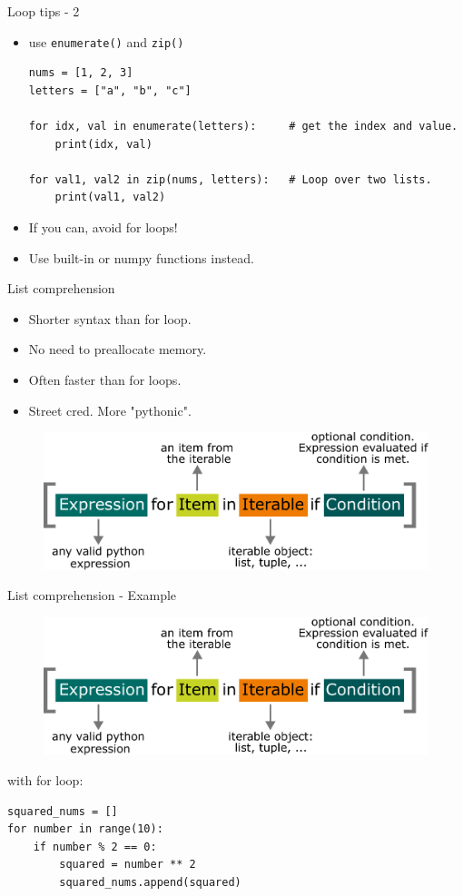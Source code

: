 \documentclass[compress%
,aspectratio=169%
]{beamer}
\newcommand{\code}{\lstinline}
\begin{document}
\begin{frame}[fragile]{Loop tips - 2}
\begin{itemize}
    \item use \code|enumerate()| and \code|zip()|
    
\begin{lstlisting}
nums = [1, 2, 3]
letters = ["a", "b", "c"]

for idx, val in enumerate(letters):     # get the index and value.
    print(idx, val)

for val1, val2 in zip(nums, letters):   # Loop over two lists.
    print(val1, val2)
\end{lstlisting}

    \item If you can, \alert{avoid for loops!}
    \item Use built-in or numpy functions instead.
\end{itemize}

\end{frame}




\begin{frame}[fragile]{List comprehension}
    \begin{itemize}
        \item Shorter syntax than for loop.
        \item No need to preallocate memory.
        \item Often faster than for loops.
        \item Street cred. More "pythonic".
    \end{itemize}
    
\begin{figure}
    \centering
    \includegraphics[width=0.6\linewidth]{img/list_comprehension.pdf}
\end{figure}
\end{frame}

\begin{frame}[fragile]{List comprehension - Example}
\begin{figure}
    \centering
    \includegraphics[width=0.6\linewidth]{img/list_comprehension.pdf}
\end{figure}

with for loop:
\begin{lstlisting}
squared_nums = []
for number in range(10):
    if number % 2 == 0:
        squared = number ** 2
        squared_nums.append(squared)
\end{lstlisting}
\end{frame}
\end{document}
